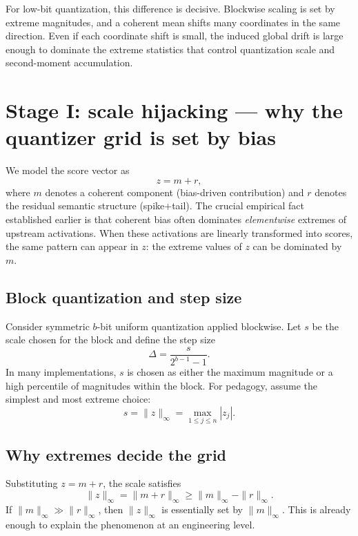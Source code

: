 For low-bit quantization, this difference is decisive.
Blockwise scaling is set by extreme magnitudes, and a coherent mean shifts
many coordinates in the same direction.
Even if each coordinate shift is small, the induced global drift is large enough
to dominate the extreme statistics that control quantization scale and
second-moment accumulation.

\section{Stage I: scale hijacking --- why the quantizer grid is set by bias}

We model the score vector as
\begin{equation}
z = m + r,
\label{eq:z_m_r_ch1}
\end{equation}
where $m$ denotes a coherent component (bias-driven contribution) and $r$ denotes
the residual semantic structure (spike+tail). The crucial empirical fact established
earlier is that coherent bias often dominates \emph{elementwise} extremes of upstream
activations. When these activations are linearly transformed into scores, the same
pattern can appear in $z$: the extreme values of $z$ can be dominated by $m$.

\subsection{Block quantization and step size}

Consider symmetric $b$-bit uniform quantization applied blockwise. Let $s$ be the
scale chosen for the block and define the step size
\begin{equation}
\Delta = \frac{s}{2^{b-1}-1}.
\label{eq:delta_def_ch1}
\end{equation}
In many implementations, $s$ is chosen as either the maximum magnitude or a high
percentile of magnitudes within the block. For pedagogy, assume the simplest and
most extreme choice:
\begin{equation}
s = \|z\|_\infty = \max_{1\le j\le n}|z_j|.
\label{eq:scale_inf}
\end{equation}

\subsection{Why extremes decide the grid}

Substituting $z=m+r$, the scale satisfies
\begin{equation}
\|z\|_\infty = \|m+r\|_\infty \ge \|m\|_\infty - \|r\|_\infty.
\end{equation}
If $\|m\|_\infty \gg \|r\|_\infty$, then $\|z\|_\infty$ is essentially set by $\|m\|_\infty$.
This is already enough to explain the phenomenon at an engineering level.

